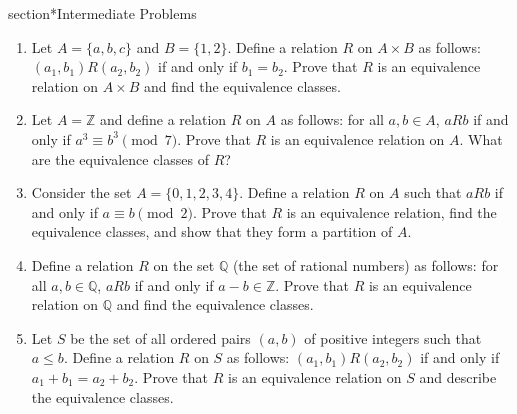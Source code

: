 section*{Intermediate Problems}

\begin{enumerate}
\item
Let $A = \{a, b, c\}$ and $B = \{1, 2\}$. Define a relation $R$ on $A \times B$ as follows: $(a_1, b_1)R(a_2, b_2)$ if and only if $b_1 = b_2$. Prove that $R$ is an equivalence relation on $A \times B$ and find the equivalence classes.

\item
Let $A = \mathbb{Z}$ and define a relation $R$ on $A$ as follows: for all $a, b \in A$, $aRb$ if and only if $a^3 \equiv b^3 \pmod{7}$. Prove that $R$ is an equivalence relation on $A$. What are the equivalence classes of $R$?

\item
Consider the set $A = \{0, 1, 2, 3, 4\}$. Define a relation $R$ on $A$ such that $aRb$ if and only if $a \equiv b \pmod{2}$. Prove that $R$ is an equivalence relation, find the equivalence classes, and show that they form a partition of $A$.

\item
Define a relation $R$ on the set $\mathbb{Q}$ (the set of rational numbers) as follows: for all $a, b \in \mathbb{Q}$, $aRb$ if and only if $a - b \in \mathbb{Z}$. Prove that $R$ is an equivalence relation on $\mathbb{Q}$ and find the equivalence classes.

\item
Let $S$ be the set of all ordered pairs $(a, b)$ of positive integers such that $a \leq b$. Define a relation $R$ on $S$ as follows: $(a_1, b_1)R(a_2, b_2)$ if and only if $a_1 + b_1 = a_2 + b_2$. Prove that $R$ is an equivalence relation on $S$ and describe the equivalence classes.
\end{enumerate}
